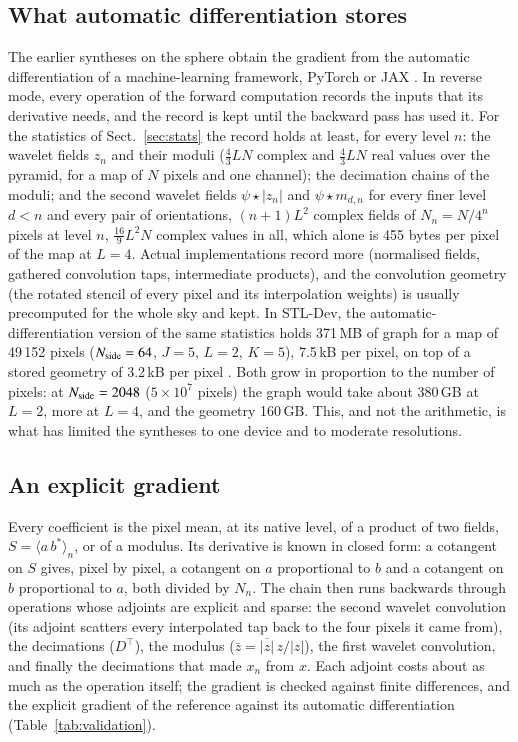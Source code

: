 \documentclass{aa}
\newcommand{\nside}{N_{\rm side}}
\begin{document}
\subsection{What automatic differentiation stores}
\label{sec:ad}

The earlier syntheses on the sphere \citep{delouis2022,mousset2024} obtain the gradient from the automatic differentiation of a machine-learning framework, PyTorch \citep{paszke2019} or JAX \citep{jax2018}. In reverse mode, every operation of the forward computation records the inputs that its derivative needs, and the record is kept until the backward pass has used it. For the statistics of Sect.~\ref{sec:stats} the record holds at least, for every level $n$: the wavelet fields $z_n$ and their moduli ($\frac{4}{3}LN$ complex and $\frac{4}{3}LN$ real values over the pyramid, for a map of $N$ pixels and one channel); the decimation chains of the moduli; and the second wavelet fields $\psi\star|z_n|$ and $\psi\star m_{d,n}$ for every finer level $d<n$ and every pair of orientations, $(n+1)L^2$ complex fields of $N_n = N/4^n$ pixels at level $n$, $\frac{16}{9}L^2N$ complex values in all, which alone is 455 bytes per pixel of the map at $L=4$. Actual implementations record more (normalised fields, gathered convolution taps, intermediate products), and the convolution geometry (the rotated stencil of every pixel and its interpolation weights) is usually precomputed for the whole sky and kept. In STL-Dev, the automatic-differentiation version of the same statistics holds 371\,MB of graph for a map of 49\,152 pixels ($\nside=64$, $J=5$, $L=2$, $K=5$), 7.5\,kB per pixel, on top of a stored geometry of 3.2\,kB per pixel \citep{stldev}. Both grow in proportion to the number of pixels: at $\nside=2048$ ($5\times10^7$ pixels) the graph would take about 380\,GB at $L=2$, more at $L=4$, and the geometry 160\,GB. This, and not the arithmetic, is what has limited the syntheses to one device and to moderate resolutions.

\subsection{An explicit gradient}
\label{sec:explicit}

Every coefficient is the pixel mean, at its native level, of a product of two fields, $S=\langle a\,b^*\rangle_n$, or of a modulus. Its derivative is known in closed form: a cotangent on $S$ gives, pixel by pixel, a cotangent on $a$ proportional to $b$ and a cotangent on $b$ proportional to $a$, both divided by $N_n$. The chain then runs backwards through operations whose adjoints are explicit and sparse: the second wavelet convolution (its adjoint scatters every interpolated tap back to the four pixels it came from), the decimations ($D^\top$), the modulus ($\bar z = \overline{|z|}\,z/|z|$), the first wavelet convolution, and finally the decimations that made $x_n$ from $x$. Each adjoint costs about as much as the operation itself; the gradient is checked against finite differences, and the explicit gradient of the reference against its automatic differentiation (Table~\ref{tab:validation}).
\end{document}
